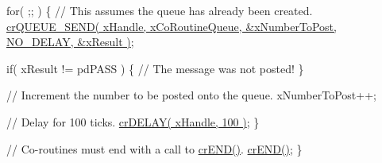 \begin{DoxyPre}   for( ;; )
   \{
       // This assumes the queue has already been created.
       \hyperlink{croutine_8h_a26af3d36f22a04168eebdf5b08465d6e}{crQUEUE\_SEND( xHandle, xCoRoutineQueue, &xNumberToPost, NO\_DELAY, &xResult )};\end{DoxyPre}



\begin{DoxyPre}       if( xResult != pdPASS )
       \{
           // The message was not posted!
       \}\end{DoxyPre}



\begin{DoxyPre}       // Increment the number to be posted onto the queue.
       xNumberToPost++;\end{DoxyPre}



\begin{DoxyPre}       // Delay for 100 ticks.
       \hyperlink{croutine_8h_a05a06feb11028f2d1d440ea335f562ba}{crDELAY( xHandle, 100 )};
   \}\end{DoxyPre}



\begin{DoxyPre}   // Co-routines must end with a call to \hyperlink{croutine_8h_ae6038cc976689b50000475ebfc4e2f23}{crEND()}.
   \hyperlink{croutine_8h_ae6038cc976689b50000475ebfc4e2f23}{crEND()};
\}\end{DoxyPre}
 